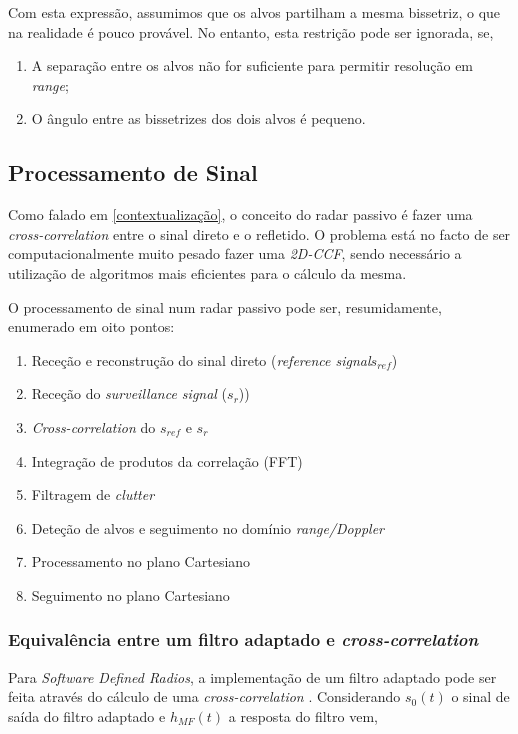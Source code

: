 Com esta expressão, assumimos que os alvos partilham a mesma bissetriz, o que na realidade é pouco provável. No entanto, esta restrição pode ser ignorada, se,
\begin{enumerate}
	\item A separação entre os alvos não for suficiente para permitir resolução em \textit{range};
	\item O ângulo entre as bissetrizes dos dois alvos é pequeno.
\end{enumerate}


\subsection{Processamento de Sinal}
Como falado em \ref{contextualização}, o conceito do radar passivo é fazer uma \textit{cross-correlation} entre o sinal direto e o refletido. O problema está no facto de ser computacionalmente muito pesado fazer uma \textit{\gls{2D-CCF}}, sendo necessário a utilização de algoritmos mais eficientes para o cálculo da mesma.\par
O processamento de sinal num radar passivo pode ser, resumidamente, enumerado em oito pontos:
\begin{enumerate}
	\item Receção e reconstrução do sinal direto (\textit{reference signal}$s_{ref}$)
	\item Receção do \textit{surveillance signal} ($s_{r}$))
	\item \textit{Cross-correlation} do $s_{ref}$ e $s_{r}$
	\item Integração de produtos da correlação (FFT)
	\item Filtragem de \textit{clutter}
	\item Deteção de alvos e seguimento no domínio \textit{range/Doppler}
	\item Processamento no plano Cartesiano
	\item Seguimento no plano Cartesiano
\end{enumerate}

\subsubsection*{Equivalência entre um filtro adaptado e \textit{cross-correlation}}

Para \textit{Software Defined Radios}, a implementação de um filtro adaptado pode ser feita através do cálculo de uma \textit{cross-correlation} \parencite{Martorella}. Considerando $s_{0}(t)$ o sinal de saída do filtro adaptado e $h_{MF}(t)$ a resposta do filtro vem, 


